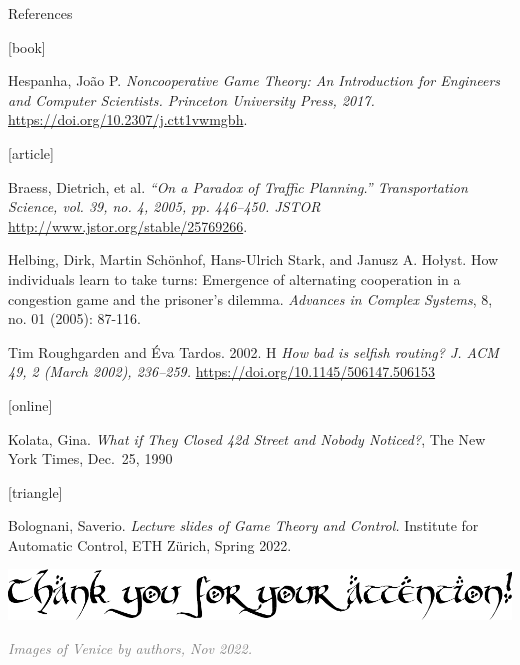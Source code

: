\documentclass[aspectratio=169]{beamer}
\begin{document}

%     
%     
    

\begin{frame}[allowframebreaks]{References}
    
    \begin{thebibliography}{}
        \small
        
        [book]
        
        Hespanha, João P.
        \newblock \emph{Noncooperative Game Theory: An Introduction for Engineers and Computer Scientists. Princeton University Press, 2017.}
        \newblock \url{https://doi.org/10.2307/j.ctt1vwmgbh}.

        [article]

        Braess, Dietrich, et al. 
        \newblock \emph{``On a Paradox of Traffic Planning.” Transportation Science, vol. 39, no. 4, 2005, pp. 446–450. JSTOR} \newblock \url{http://www.jstor.org/stable/25769266}.
        
        Helbing, Dirk, Martin Schönhof, Hans-Ulrich Stark, and Janusz A. Hołyst.
        \newblock How individuals learn to take turns: Emergence of alternating cooperation in a congestion game and the prisoner's dilemma.
        \newblock \emph{Advances in Complex Systems}, 8, no. 01 (2005): 87-116.

        Tim Roughgarden and Éva Tardos. 2002. H
        \newblock \emph{How bad is selfish routing? J. ACM 49, 2 (March 2002), 236–259.} \newblock \url{https://doi.org/10.1145/506147.506153}


        [online]

        Kolata, Gina. 
        \newblock \emph{What if They Closed 42d Street and Nobody Noticed?}, The New York Times, Dec.~25, 1990

        [triangle]

        Bolognani, Saverio.
        \newblock \emph{Lecture slides of Game Theory and Control.}
        \newblock Institute for Automatic Control, ETH Z\"urich, Spring 2022.

    \end{thebibliography}
    \vfill
\begin{center}
    
    \includegraphics[width=0.5\linewidth]{images/thank_you.png}
\end{center}
    
    \vfill
    
    \hfill \textcolor{gray}{\textit{\footnotesize Images of Venice by authors, Nov 2022.}}
\end{frame}
\end{document}
